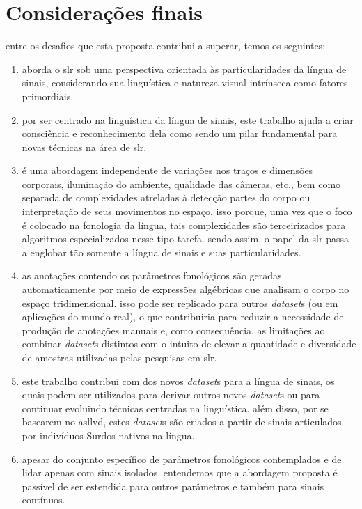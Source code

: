 \chapter{Considerações finais}
\label{cap:consideracoes-finais}

%





entre os desafios que esta proposta contribui a superar, temos os seguintes:

\begin{enumerate}
    \item aborda o \acrshort{slr} sob uma perspectiva orientada às particularidades da língua de sinais, considerando sua linguística e natureza visual intrínseca como fatores primordiais.
    
    \item por ser centrado na linguística da língua de sinais, este trabalho ajuda a criar consciência e reconhecimento dela como sendo um pilar fundamental para novas técnicas na área de \acrshort{slr}.

    \item é uma abordagem independente de variações nos traços e dimensões corporais, iluminação do ambiente, qualidade das câmeras, etc., bem como separada de complexidades atreladas à detecção partes do corpo ou interpretação de seus movimentos no espaço. isso porque, uma vez que o foco é colocado na fonologia da língua, tais complexidades são terceirizados para algoritmos especializados nesse tipo tarefa. sendo assim, o papel da \acrshort{slr} passa a englobar tão somente a língua de sinais e suas particularidades.
    
    \item as anotações contendo os parâmetros fonológicos são geradas automaticamente por meio de expressões algébricas que analisam o corpo no espaço tridimensional. isso pode ser replicado para outros \textit{dataset}s (ou em aplicações do mundo real), o que contribuiria para reduzir a necessidade de produção de anotações manuais e, como consequência, as limitações ao combinar \textit{dataset}s distintos com o intuito de elevar a quantidade e diversidade de amostras utilizadas pelas pesquisas em \acrshort{slr}.
    
    \item este trabalho contribui com dos novos \textit{dataset}s para a língua de sinais, os quais podem ser utilizados para derivar outros novos \textit{dataset}s ou para continuar evoluindo técnicas centradas na linguística. além disso, por se basearem no \acrshort{asllvd}, estes \textit{dataset}s são criados a partir de sinais articulados por indivíduos Surdos nativos na língua.

    \item apesar do conjunto específico de parâmetros fonológicos contemplados e de lidar apenas com sinais isolados, entendemos que a abordagem proposta é passível de ser estendida para outros parâmetros e também para sinais contínuos.

\end{enumerate}


